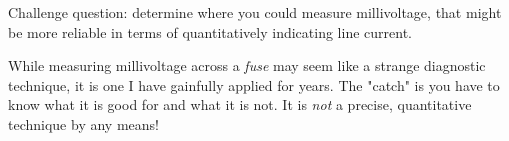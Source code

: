 \vskip 10pt

Challenge question: determine where you could measure millivoltage, that might be more reliable in terms of quantitatively indicating line current.







While measuring millivoltage across a {\it fuse} may seem like a strange diagnostic technique, it is one I have gainfully applied for years.  The "catch" is you have to know what it is good for and what it is not.  It is {\it not} a precise, quantitative technique by any means!




